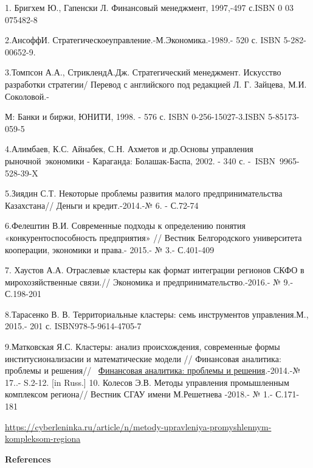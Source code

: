 \begin{references}

1. Бригхем Ю., Гапенски Л. Финансовый менеджмент, 1997,-497 с.ISBN 0 03
075482-8

2.АнсоффИ. Стратегическоеуправление.-М.Экономика.-1989.- 520 с. ISBN
5-282-00652-9.

3.Томпсон А.А., СтриклендА.Дж. Стратегический менеджмент. Искусство
разработки стратегии/ Перевод с английского под редакцией Л. Г. Зайцева,
М.И. Соколовой.-

М: Банки и биржи, ЮНИТИ, 1998. - 576 с. ISBN 0-256-15027-3.ISBN
5-85173-059-5

4.Алимбаев, К.С. Айнабек, С.Н. Ахметов и др.Основы управления
рыночной~экономики - Караганда: Болашак-Баспа, 2002. - 340 с.
-~ISBN~9965-528-39-X

5.Зиядин С.Т. Некоторые проблемы развития малого предпринимательства
Казахстана// Деньги и кредит.-2014.-№ 6. - С.72-74

6.Фелештин В.И. Современные подходы к определению понятия
«конкурентоспособность предприятия» // Вестник Белгородского
университета кооперации, экономики и права.- 2015.- № 3.- С.401-409

7. Хаустов А.А. Отраслевые кластеры как формат интеграции регионов СКФО
в мирохозяйственные связи.// Экономика и предпринимательство.-2016.- №
9.- С.198-201

8.Тарасенко В. В. Территориальные кластеры: семь инструментов
управления.М., 2015.- 201 с. ISBN978-5-9614-4705-7

9.Матковская Я.С. Кластеры: анализ происхождения, современные формы
институсионализасии и математические модели // Финансовая аналитика:
проблемы и решения//
~\href{https://www.fin-izdat.ru/journal/fa/}{Финансовая аналитика:
проблемы и решения}.-2014.-№ 17..- S.2-12. [in Russ.]
10. Колесов Э.В. Методы управления промышленным комплексом региона//
Вестник СГАУ имени М.Решетнева -2018.- № 1.- С.171-181

\url{https://cyberleninka.ru/article/n/metody-upravleniya-promyshlennym-kompleksom-regiona}
\end{references}

\begin{center}
{\bfseries References}
\end{center}

